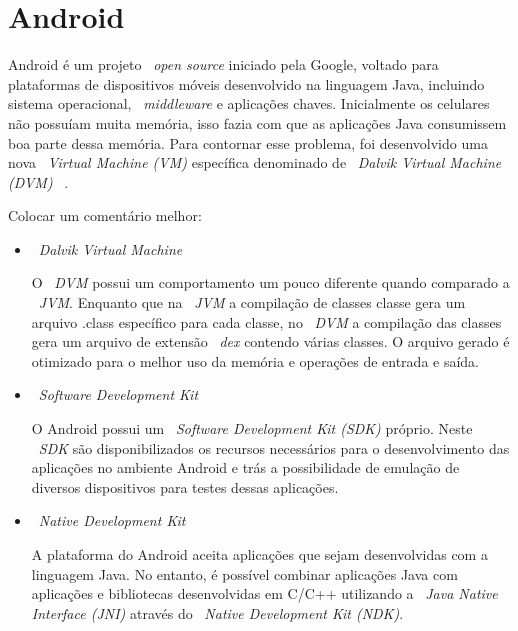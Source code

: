 \chapter{Android}
	
	Android é um projeto ~\textit{open source} iniciado pela Google, voltado para plataformas de
	dispositivos móveis desenvolvido na linguagem Java, incluindo sistema operacional,
	~\textit{middleware} e aplicações chaves. Inicialmente os celulares não possuíam muita memória,
	isso fazia com que as aplicações Java consumissem boa parte dessa memória. Para contornar esse
	problema, foi desenvolvido uma nova ~\textit{Virtual Machine (VM)} específica denominado de
	~\textit{Dalvik Virtual Machine (DVM)} ~\cite{android}.
	
	Colocar um comentário melhor:
	
	\begin{itemize}
	  \item {~\textit{Dalvik Virtual Machine \\}}
	  
			O ~\textit{DVM} possui um comportamento um pouco diferente quando comparado a ~\textit{JVM}.
			Enquanto que na ~\textit{JVM} a compilação de classes classe gera um arquivo .class específico
			para cada classe, no ~\textit{DVM} a compilação das classes gera um arquivo de extensão
			~\textit{dex} contendo várias classes. O arquivo gerado é otimizado para o melhor uso da memória e
			operações de entrada e saída. \\
	  
	  \item  {~\textit{Software Development Kit} \\}
		
		O Android possui um ~\textit{Software Development Kit (SDK)} próprio. Neste ~\textit{SDK} são
		disponibilizados os recursos necessários para o desenvolvimento das aplicações no ambiente Android
		e trás a possibilidade de emulação de diversos dispositivos para testes dessas aplicações. \\
		
	  \item {~\textit{Native Development Kit} \\}		
	
		A plataforma do Android aceita aplicações que sejam desenvolvidas com a linguagem Java. No entanto,
		é possível combinar aplicações Java com aplicações e bibliotecas desenvolvidas em C/C++ utilizando
		a ~\textit{Java Native Interface (JNI)} através do ~\textit{Native Development Kit (NDK)}. \\
	
	\end{itemize}

